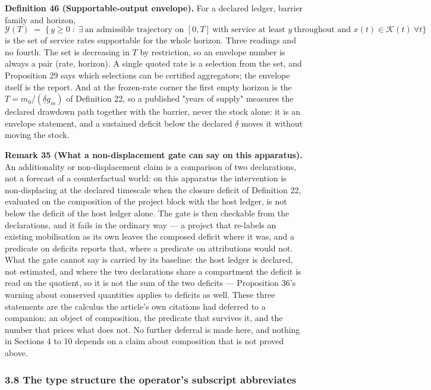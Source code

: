 \documentclass[11pt]{article}
\begin{document}
\textbf{Definition 46 (Supportable-output envelope).} For a declared ledger, barrier family and horizon,
\[ \mathcal Y(T) \;=\; \bigl\{\, y \ge 0 \;:\; \exists\ \text{an admissible trajectory on } [0,T] \ \text{with service at least } y \ \text{throughout and } x(t) \in \mathcal K(t) \ \forall t \bigr\} \]
is the set of service rates supportable for the whole horizon. Three readings and no fourth. The set is
decreasing in \(T\) by restriction, so an envelope number is always a pair (rate, horizon). A single quoted
rate is a selection from the set, and Proposition 29 says which selections can be certified aggregators;
the envelope itself is the report. And at the frozen-rate corner the first empty horizon is the
\(T = m_0/(\underline\delta g_m)\) of Definition 22, so a published "years of supply" measures the declared
drawdown path together with the barrier, never the stock alone: it is an envelope statement, and a
sustained deficit below the declared \(\underline\delta\) moves it without moving the stock.

\textbf{Remark 35 (What a non-displacement gate can say on this apparatus).} An additionality or
non-displacement claim is a comparison of two declarations, not a forecast of a counterfactual world: on this
apparatus the intervention is non-displacing at the declared timescale when the closure deficit of
Definition 22, evaluated on the composition of the project block with the host ledger, is not below the
deficit of the host ledger alone. The gate is then checkable from the declarations, and it fails in the
ordinary way --- a project that re-labels an existing mobilisation as its own leaves the composed deficit
where it was, and a predicate on deficits reports that, where a predicate on attributions would not. What
the gate cannot say is carried by its baseline: the host ledger is declared, not estimated, and where the
two declarations share a compartment the deficit is read on the quotient, so it is not the sum of the two
deficits --- Proposition 36's warning about conserved quantities applies to deficits as well.
These three statements are the calculus the article's own citations had deferred to a companion: an
object of composition, the predicate that survives it, and the number that prices what does not. No
further deferral is made here, and nothing in Sections 4 to 10 depends on a claim about composition
that is not proved above.

\subsubsection{3.8 The type structure the operator's subscript abbreviates}\label{3-8-the-type-structure-the-operator-s-subscript-abbreviates}
\end{document}
